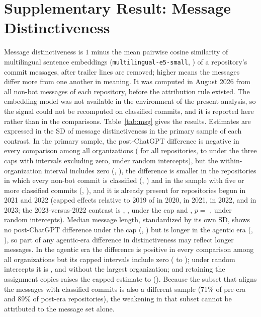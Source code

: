 \documentclass[acmsmall,screen,review,anonymous]{acmart}
\begin{document}
\FloatBarrier
\section{Supplementary Result: Message Distinctiveness}
\label{app:msg}

Message distinctiveness is $1$ minus the mean pairwise cosine similarity of multilingual sentence embeddings (\texttt{multilingual-e5-small}, \citealp{wang2024multilingual}) of a repository's commit messages, after trailer lines are removed; higher means the messages differ more from one another in meaning. It was computed in August 2026 from all non-bot messages of each repository, before the attribution rule existed. The embedding model was not available in the environment of the present analysis, so the signal could not be recomputed on classified commits, and it is reported here rather than in the comparisons. Table~\ref{tab:msg} gives the results. Estimates are expressed in the SD of message distinctiveness in the primary sample of each contrast. In the primary sample, the post-ChatGPT difference is negative in every comparison among all organizations ( for all repositories,  to  under the three caps with intervals excluding zero,  under random intercepts), but the within-organization interval includes zero (, ), the difference is smaller in the repositories in which every non-bot commit is classified (, ) and in the sample with five or more classified commits (, ), and it is already present for repositories begun in 2021 and 2022 (capped effects relative to 2019 of  in 2020,  in 2021,  in 2022, and  in 2023; the 2023-versus-2022 contrast is , , under the cap and , $p = $ , under random intercepts). Median message length, standardized by its own SD, shows no post-ChatGPT difference under the cap (, ) but is longer in the agentic era (, ), so part of any agentic-era difference in distinctiveness may reflect longer messages. In the agentic era the difference is positive in every comparison among all organizations but its capped intervals include zero ( to ); under random intercepts it is , and  without the largest organization; and retaining the assignment copies raises the capped estimate to  (). Because the subset that aligns the messages with classified commits is also a different sample (71\% of pre-era and 89\% of post-era repositories), the weakening in that subset cannot be attributed to the message set alone.
\end{document}
